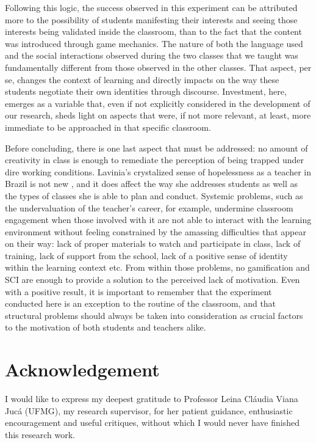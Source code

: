 \documentclass[english]{textolivre}
\begin{document}
Following this logic, the success observed in this experiment can be attributed more to the possibility of students manifesting their interests and seeing those interests being validated inside the classroom, than to the fact that the content was introduced through game mechanics. The nature of both the language used and the social interactions observed during the two classes that we taught was fundamentally different from those observed in the other classes. That aspect, per se, changes the context of learning and directly impacts on the way these students negotiate their own identities through discourse. Investment, here, emerges as a variable that, even if not explicitly considered in the development of our research, sheds light on aspects that were, if not more relevant, at least, more immediate to be approached in that specific classroom.

Before concluding, there is one last aspect that must be addressed: no amount of creativity in class is enough to remediate the perception of being trapped under dire working conditions. Lavinia’s crystalized sense of hopelessness as a teacher in Brazil is not new \cite{barcelos2018emotions}, and it does affect the way she addresses students as well as the types of classes she is able to plan and conduct. Systemic problems, such as the undervaluation of the teacher’s career, for example, undermine classroom engagement when those involved with it are not able to interact with the learning environment without feeling constrained by the amassing difficulties that appear on their way: lack of proper materials to watch and participate in class, lack of training, lack of support from the school, lack of a positive sense of identity within the learning context etc. From within those problems, no gamification and SCI are enough to provide a solution to the perceived lack of motivation. Even with a positive result, it is important to remember that the experiment conducted here is an exception to the routine of the classroom, and that structural problems should always be taken into consideration as crucial factors to the motivation of both students and teachers alike.

\section{Acknowledgement}

I would like to express my deepest gratitude to Professor Leina Cláudia Viana Jucá (UFMG), my research supervisor, for her patient guidance, enthusiastic encouragement and useful critiques, without which I would never have finished this research work.




\printbibliography\label{sec-bib}
\end{document}
